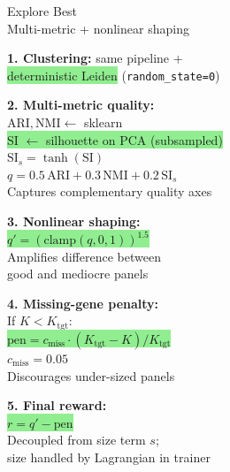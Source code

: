 \documentclass[8pt]{article}
\newlength{\colw}
\begin{document}
\hfill
\begin{minipage}[t]{\colw}
\begin{tcolorbox}[colback=hdrB, colframe=hdrB, fontupper=\bfseries\footnotesize\color{white},
    arc=2pt, left=2pt, right=2pt, top=1pt, bottom=1pt]
\centering Explore Best\\[-2pt]
{\scriptsize\mdseries Multi-metric + nonlinear shaping}
\end{tcolorbox}
\vspace{1pt}

\begin{keyboxG}
\textbf{1. Clustering:} same pipeline +\\
\colorbox{lightgreen}{deterministic Leiden} (\texttt{random\_state=0})
\end{keyboxG}\vspace{1pt}

\begin{keyboxG}
\textbf{2. Multi-metric quality:}\\
$\text{ARI}, \text{NMI} \gets$ sklearn\\
\colorbox{lightgreen}{SI $\gets$ silhouette on PCA (subsampled)}\\
$\text{SI}_s = \tanh(\text{SI})$\\
$q = 0.5\,\text{ARI} + 0.3\,\text{NMI} + 0.2\,\text{SI}_s$\\
{\scriptsize\color{added} Captures complementary quality axes}
\end{keyboxG}\vspace{1pt}

\begin{keyboxG}
\textbf{3. Nonlinear shaping:}\\
\colorbox{lightgreen}{$q' = (\text{clamp}(q, 0, 1))^{1.5}$}\\
{\scriptsize\color{added} Amplifies difference between\\
good and mediocre panels}
\end{keyboxG}\vspace{1pt}

\begin{keyboxG}
\textbf{4. Missing-gene penalty:}\\
If $K < K_\text{tgt}$:\\
\colorbox{lightgreen}{$\text{pen} = c_\text{miss} \cdot (K_\text{tgt} - K) / K_\text{tgt}$}\\
$c_\text{miss} = 0.05$\\
{\scriptsize\color{added} Discourages under-sized panels}
\end{keyboxG}\vspace{1pt}

\begin{keyboxG}
\textbf{5. Final reward:}\\
\colorbox{lightgreen}{$r = q' - \text{pen}$}\\
{\scriptsize Decoupled from size term $s$;\\
size handled by Lagrangian in trainer}
\end{keyboxG}
\end{minipage}%
\end{document}
